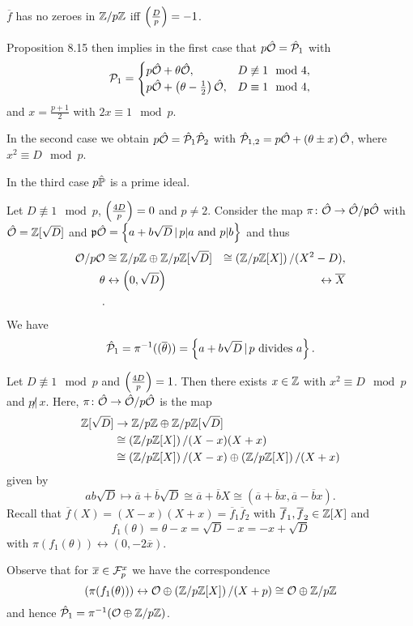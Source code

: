 \bigskip $\overline{f}$ has no zeroes in  $\Z / p\Z$ iff $\Legendre{D}{p} = -1$.

\bigskip Proposition 8.15 then implies in the first case that
$p\hat{\O} = \hat{\PP}_1$ with 
\[\PP_1 = \begin{cases}
p\hat{\O} +\theta \hat{\O}, & D \not \equiv 1 \mod 4, \\
p\hat{\O} + \left( \theta - \frac{1}{2} \right) \hat{\O}, & D \equiv 1 \mod 4, \\
\end{cases}
\]
and $x = \frac{p+1}{2}$ with  $2x \equiv 1 \mod p$.

\bigskip
In the second case we obtain $p \hat{\O} = \hat{\PP}_1\hat{\PP}_2$ with
$\hat{\PP}_{1,2} = p \hat{\O} + \left(\theta \pm x  \right) \hat{\O}$, where $x^2 \equiv D \mod p$.

\bigskip
In the third case $p\hat{\P}$ is a prime ideal.


\begin{Bsp*}
Let $D\not\equiv 1 \mod p$, $\Legendre{4D}{p} = 0$ and $p \neq 2$. Consider the map
$\pi \colon \hat{\O} \to \hat{\O} / \p\hat{\O}$
with $\hat{\O} = \Z[\sqrt{D}]$ and $\p \hat{\O} = \left\{
a+b\sqrt{D} \, | \, p | a \text{ and } p | b \right\}$ and thus
\begin{align*}
\O / p\O 
&\cong \Z / p\Z \oplus \Z / p\Z [\sqrt{D}] 
&\cong \left( \Z / p\Z [X] \right) / (X^2-D), \\
\theta 
&\leftrightarrow \left(0, \sqrt{D}\right)
&\leftrightarrow \overline{X} \\.
\end{align*}
We have
\[ \hat{\PP}_1 = \pi^{-1}((\overline{\theta}))
= \left\{ a+b \sqrt{D} \, | \, p \text{ divides } a \right\}.
\]
\end{Bsp*}

\begin{Bsp*}
Let $D\not\equiv 1 \mod p$ and $\Legendre{4D}{p} = 1$.
Then there exists $x \in \Z$ with $x^2 \equiv D \mod p$ and $p \not | \, x$.
Here, $\pi \colon \hat{\O} \to \hat{\O} / p\hat{\O}$ is the map
\begin{align*}
\Z[\sqrt{D}] 
&\to \Z / p\Z \oplus \Z / p\Z [\sqrt{D}] \\
&\cong \left( \Z / p\Z [X] \right) / (X-x)(X+x) \\
&\cong \left( \Z / p\Z [X] \right) / (X-x) \oplus \left( \Z / p\Z [X] \right) / (X+x)
\end{align*}
given by
\[ a b \sqrt{D}
\mapsto \overline{a} + \overline{b} \sqrt{D}
\cong \overline{a} + \overline{b} X
\cong ( \overline{a} + \overline{b} x, \overline{a} - \overline{b} x ).
\]
Recall that $\overline{f}(X)=(X-x)(X+x) = \overline{f}_1 \overline{f}_2$ with $\overline{f}_1, \overline{f}_2 \in \Z[X]$ and
\[ f_1(\theta) = \theta -x = \sqrt{D} -x = -x + \sqrt{D}
\]
with $\pi(f_1(\theta)) \leftrightarrow (0, -2 \overline{x})$.

\bigskip
Observe that for $\overline{x} \in \F_p^x$ we have the correspondence
\[ (\pi(f_1(\theta))) 
\leftrightarrow \O \oplus \left( \Z / p\Z [X] \right) / (X+p)
\cong \O \oplus  \Z / p\Z 
\]
and hence $\hat{\PP}_1 = \pi^{-1}(\O \oplus  \Z / p\Z  )$.
\end{Bsp*}



